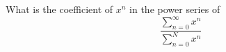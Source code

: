   What is the coefficient of $x^n$ in the power series of
  \[
    \frac{\sum_{n=0}^\infty x^n}{\sum_{n=0}^N x^n}
  \]
